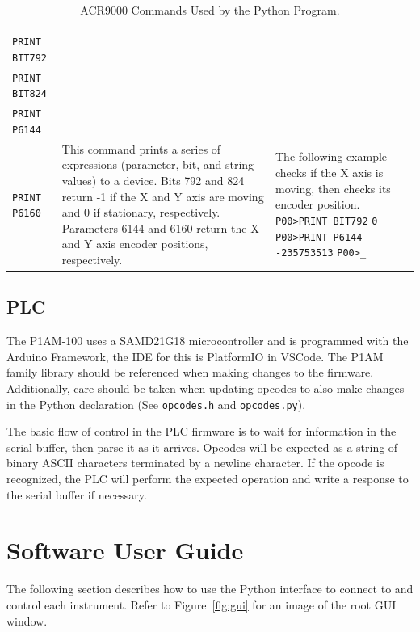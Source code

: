 \documentclass[titlepage]{article}
\begin{document}
\begin{table}[ht]
\begin{center}
\begin{tabularx}{\linewidth}{l|>{\raggedright\arraybackslash}X|>{\raggedright\arraybackslash}X}
      \makecell[lt]{
        \lstinline|PRINT| \\
        \lstinline|PRINT BIT792| \\
        \lstinline|PRINT BIT824| \\
        \lstinline|PRINT P6144| \\
        \lstinline|PRINT P6160|
      } &
      This command prints a series of expressions (parameter, bit, and string values) to a device. Bits 792 and 824 return -1 if the X and Y axis are moving and 0 if stationary, respectively. Parameters 6144 and 6160 return the X and Y axis encoder positions, respectively. &
      The following example checks if the X axis is moving, then checks its encoder position. \newline
      \lstinline|P00>PRINT BIT792| \newline
      \lstinline|0| \newline
      \lstinline|P00>PRINT P6144| \newline
      \lstinline|-235753513| \newline
      \lstinline|P00>_|
    \end{tabularx}
  \end{center}
  \caption{ACR9000 Commands Used by the Python Program.}\label{tab:acrcommands}
\end{table}

\subsection{PLC}\label{sec:commsplc}
The P1AM-100 uses a SAMD21G18 microcontroller and is programmed with the Arduino Framework, the IDE for this is PlatformIO in VSCode. The P1AM family library should be referenced when making changes to the firmware. Additionally, care should be taken when updating opcodes to also make changes in the Python declaration (See \verb|opcodes.h| and \verb|opcodes.py|).

The basic flow of control in the PLC firmware is to wait for information in the serial buffer, then parse it as it arrives. Opcodes will be expected as a string of binary ASCII characters terminated by a newline character. If the opcode is recognized, the PLC will perform the expected operation and write a response to the serial buffer if necessary.

\section{Software User Guide}
The following section describes how to use the Python interface to connect to and control each instrument. Refer to Figure~\ref{fig:gui} for an image of the root GUI window.
\end{document}
